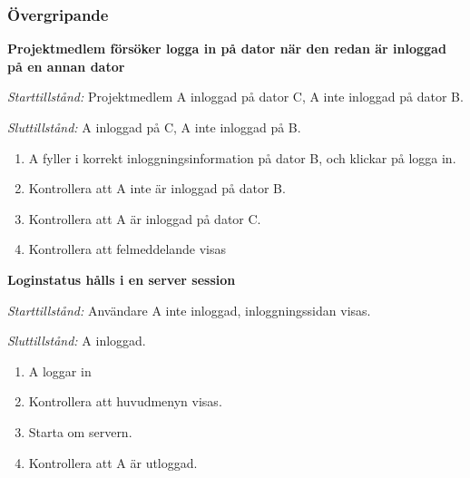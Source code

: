 \documentclass[a4paper]{article}
\begin{document}
\subsubsection{Övergripande}

\begin{FT}
\item
\textbf{Projektmedlem försöker logga in på dator när den redan är inloggad på en annan dator}

\emph{Starttillstånd:} Projektmedlem A inloggad på dator C, A inte inloggad på dator B.

\emph{Sluttillstånd:} A inloggad på C, A inte inloggad på B.

\begin{enumerate}
\item A fyller i korrekt inloggningsinformation på dator B, och klickar på logga in.
\item Kontrollera att A inte är inloggad på dator B.
\item Kontrollera att A är inloggad på dator C.
\item Kontrollera att felmeddelande visas
\end{enumerate}


%
%
%

\item
\textbf{Loginstatus hålls i en server session}

\emph{Starttillstånd:} Användare A inte inloggad, inloggningssidan visas.

\emph{Sluttillstånd:} A inloggad.

\begin{enumerate}
\item A loggar in
\item Kontrollera att huvudmenyn visas.
\item Starta om servern.
\item Kontrollera att A är utloggad.
\end{enumerate}




\end{FT}
\end{document}
